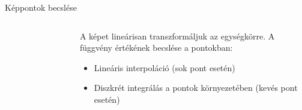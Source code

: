 \documentclass{beamer}
\begin{document}
\begin{frame}{Képpontok becslése}
\begin{columns}
\begin{column}{0.5\textwidth}
\begin{figure}
\begin{subfigure}{.48\textwidth}
            \end{subfigure}
        \end{figure}
    \end{column}
    \begin{column}{0.5\textwidth}
        A képet lineárisan transzformáljuk az egységkörre.
        \vskip 3mm
        A függvény értékének becslése a pontokban:
        \begin{itemize}
            \item Lineáris interpoláció (sok pont esetén)
            \item Diszkrét integrálás a pontok környezetében (kevés pont esetén)
        \end{itemize}
    \end{column}
\end{columns}

\end{frame}
\end{document}
